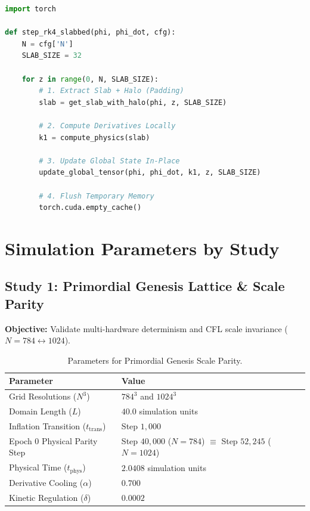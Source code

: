 \documentclass[11pt, twoside]{article}
\begin{document}
\begin{lstlisting}[language=Python, caption=Core Logic for Memory-Safe N=2048 Compute]
import torch

def step_rk4_slabbed(phi, phi_dot, cfg):
    N = cfg['N']
    SLAB_SIZE = 32
    
    for z in range(0, N, SLAB_SIZE):
        # 1. Extract Slab + Halo (Padding)
        slab = get_slab_with_halo(phi, z, SLAB_SIZE)
        
        # 2. Compute Derivatives Locally
        k1 = compute_physics(slab)
        
        # 3. Update Global State In-Place
        update_global_tensor(phi, phi_dot, k1, z, SLAB_SIZE)
        
        # 4. Flush Temporary Memory
        torch.cuda.empty_cache()
\end{lstlisting}

\section{Simulation Parameters by Study}

\subsection{Study 1: Primordial Genesis Lattice \& Scale Parity}
\textbf{Objective:} Validate multi-hardware determinism and CFL scale invariance ($N=784 \leftrightarrow 1024$).
\begin{table}[H]
\centering
\caption{Parameters for Primordial Genesis Scale Parity.}
\begin{tabular}{@{}ll@{}}
\toprule
\textbf{Parameter} & \textbf{Value} \\ \midrule
Grid Resolutions ($N^3$) & $784^3$ and $1024^3$ \\
Domain Length ($L$) & $40.0$ simulation units \\
Inflation Transition ($t_{\text{trans}}$) & Step $1,000$ \\
Epoch 0 Physical Parity Step & Step $40,000$ ($N=784$) $\equiv$ Step $52,245$ ($N=1024$) \\
Physical Time ($t_{\text{phys}}$) & $2.0408$ simulation units \\
Derivative Cooling ($\alpha$) & $0.700$ \\
Kinetic Regulation ($\delta$) & $0.0002$ \\ \bottomrule
\end{tabular}
\end{table}
\end{document}
